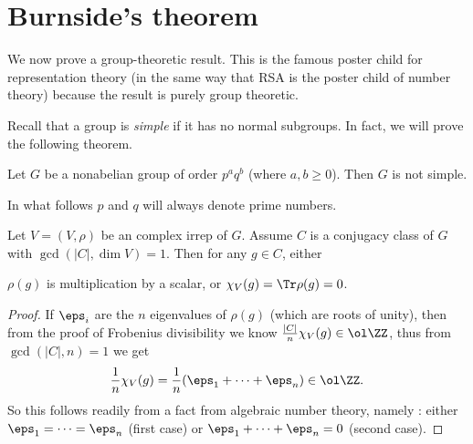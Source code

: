 \section{Burnside's theorem}
We now prove a group-theoretic result.
This is the famous poster child for representation theory
(in the same way that RSA is the poster child of number theory)
because the result is purely group theoretic.

Recall that a group is \emph{simple} if it has no normal subgroups.
In fact, we will prove the following theorem.
\begin{theorem}[Burnside]
	Let $G$ be a nonabelian group of order $p^a q^b$ (where $a,b \ge 0$).
	Then $G$ is not simple.
\end{theorem}
In what follows $p$ and $q$ will always denote prime numbers.

\begin{lemma}[On $\gcd(|C|, \dim V) = 1$]
	\label{lem:burnside_ant_lemma}
	Let $V = (V, \rho)$ be an complex irrep of $G$.
	Assume $C$ is a conjugacy class of $G$ with $\gcd(|C|, \dim V) = 1$.
	Then for any $g \in C$, either
	\begin{itemize}
		\ii $\rho(g)$ is multiplication by a scalar, or
		\ii $\chi_V(g) = \Tr \rho(g) = 0$.
	\end{itemize}
\end{lemma}
\begin{proof}
	If $\eps_i$ are the $n$ eigenvalues of $\rho(g)$ (which are roots of unity),
	then from the proof of Frobenius divisibility we know
	$\frac{|C|}{n} \chi_V(g) \in \ol\ZZ$,
	thus from $\gcd(|C|, n) = 1$ we get 
	\[ \frac1n \chi_V(g) = \frac1n(\eps_1 + \dots + \eps_n) \in \ol\ZZ. \]
	So this follows readily from a fact from algebraic number theory,
	namely :
	either $\eps_1 = \dots = \eps_n$ (first case) or
	$\eps_1 + \dots + \eps_n = 0$ (second case).
\end{proof}

